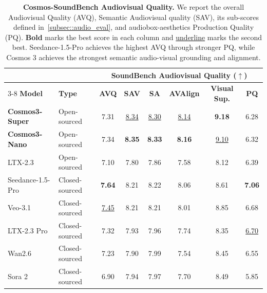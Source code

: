 \documentclass{llmxive}
\providecommand{\arraystretch}{1.5}
\begin{document}
\begin{table}[t]
    \centering
    \captionsetup{justification=raggedright, singlelinecheck=false}
    \footnotesize
    \setlength{\tabcolsep}{4pt}
    \renewcommand{\arraystretch}{1.15}
    \begin{tabular}{l l | cccccc}
        \toprule
        & & \multicolumn{6}{c}{\textbf{SoundBench Audiovisual Quality ($\uparrow$)}} \\
        \cmidrule(lr){3-8}
        \textbf{Model} & \textbf{Type} & \textbf{AVQ} & \textbf{SAV} & \textbf{SA} & \textbf{AVAlign} & \textbf{Visual Sup.} & \textbf{PQ}\\
        \midrule
        \rowcolor{rowours}
        \textbf{Cosmos3-Super} & Open-sourced & 7.31 & \underline{8.34} & \underline{8.30} &
  \underline{8.14} & \textbf{9.18} & 6.28 \\
          \rowcolor{rowours}
          \textbf{Cosmos3-Nano} & Open-sourced & 7.34 & \textbf{8.35} & \textbf{8.33} &
  \textbf{8.16} & \underline{9.10} & 6.32 \\
          \midrule
          LTX-2.3 & Open-sourced & 7.10 & 7.80 & 7.86 & 7.58 & 8.12 & 6.39\\
          \midrule
          Seedance-1.5-Pro & Closed-sourced & \textbf{7.64} & 8.21 & 8.22 & 8.06 & 8.61  & \textbf{7.06} \\
          Veo-3.1 & Closed-sourced & \underline{7.45} & 8.21 & 8.21 & 8.01 & 8.85 & 6.68 \\
          LTX-2.3 Pro & Closed-sourced & 7.32 & 7.93 & 7.96 & 7.74 & 8.35 & \underline{6.70} \\
          Wan2.6 & Closed-sourced & 7.23 & 7.90 & 7.99 & 7.54 & 8.45 & 6.55 \\
          Sora 2 & Closed-sourced & 6.90 & 7.94 & 7.97 & 7.70 & 8.49 & 5.85 \\
        \bottomrule
    \end{tabular}
\caption{\textbf{Cosmos-SoundBench Audiovisual Quality.}
    We report the overall Audiovisual Quality (AVQ), Semantic Audiovisual quality (SAV), its sub-scores defined in~\cref{subsec::audio_eval}, and audiobox-aesthetics Production Quality (PQ).
    \textbf{Bold} marks the best score in each column and \underline{underline} marks the second best.
    Seedance-1.5-Pro achieves the highest AVQ through stronger PQ, while Cosmos 3 achieves the strongest semantic audio-visual grounding and alignment.}
\label{tab:cosmos_soundbench_results}
\end{table}
\end{document}
